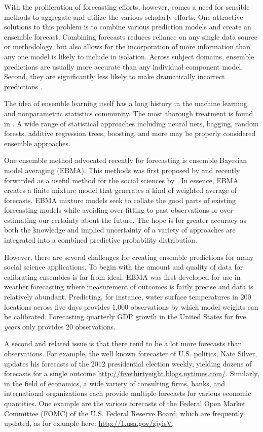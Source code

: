 \documentclass[12pt,fullpage,endnotes]{article}
\begin{document}
With the proliferation of forecasting efforts, however, comes a need
for sensible methods to aggregate and utilize the various scholarly
efforts.  One attractive solutions to this problem is to combine
various prediction models and create an ensemble forecast.  Combining
forecasts reduces reliance on any single data source or methodology,
but also allows for the incorporation of more information than any one
model is likely to include in isolation.  Across subject domains,
ensemble predictions are usually more accurate than any individual
component model. Second, they are significantly less likely to make
dramatically incorrect predictions \citep{Bates:1969,Armstrong:2001,Raftery:2005}.

The idea of ensemble learning itself has a long history in the machine
learning and nonparametric statistics community. The most thorough
treatment is found in \citet{Hastie:2009}. A wide range of statistical
approaches including neural nets, bagging, random forests, additive
regression trees, boosting, and more may be properly considered
ensemble approaches.  

One ensemble method advocated recently for forecasting is ensemble
Bayesian model averaging (EBMA). This methods was first proposed by
\citet{Raftery:2005} and recently forwarded as a useful method for the
social sciences by \citet{mhw:2012}. In essence, EBMA creates a
finite mixture model that generates a kind of weighted average of
forecasts.  EBMA mixture models seek to collate the good parts of
existing forecasting models while avoiding over-fitting to past
observations or over-estimating our certainty about the future.  The
hope is for greater accuracy as both the knowledge and implied
uncertainty of a variety of approaches are integrated into a combined
predictive probability distribution.

However, there are several challenges for creating ensemble
predictions for many social science applications.  To begin with the
amount and quality of data for calibrating ensembles is far from
ideal.  EBMA was first developed for use in weather forecasting where
measurement of outcomes is fairly precise and data is relatively
abundant.  Predicting, for instance, water surface temperatures in 200
locations across five days provides 1,000 observations by which model
weights can be calibrated.  Forecasting quarterly GDP
growth in the United States for five \textit{years} only provides 20 observations.

A second and related issue is that there tend to be a lot more
forecasts than observations.  For example, the well known forecaster of U.S. politics, Nate Silver,
updates his forecasts of the 2012 presidential election weekly, yielding dozens of forecasts
for a single outcome \url{http://fivethirtyeight.blogs.nytimes.com/}.  Similarly, in the field of economics, a wide variety of consulting firms, banks, and international organizations each provide multiple
forecasts for various economic quantities. One example are the various forecasts of the Federal Open Market Committee (FOMC) of the U.S. Federal Reserve Board, which are frequently updated, as for example here: \url{http://1.usa.gov/zjyisV}.
\end{document}
